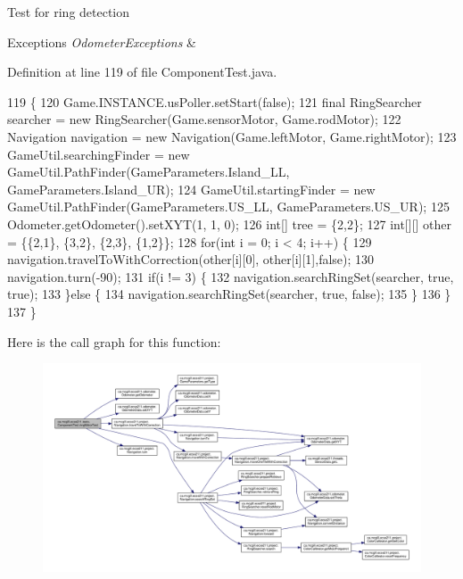 Test for ring detection


\begin{DoxyExceptions}{Exceptions}
{\em Odometer\+Exceptions} & \\
\hline
\end{DoxyExceptions}


Definition at line 119 of file Component\+Test.\+java.


\begin{DoxyCode}
119                                                                \{
120     Game.INSTANCE.usPoller.setStart(\textcolor{keyword}{false});
121     \textcolor{keyword}{final} RingSearcher searcher = \textcolor{keyword}{new} RingSearcher(Game.sensorMotor, Game.rodMotor);
122     Navigation navigation = \textcolor{keyword}{new} Navigation(Game.leftMotor, Game.rightMotor);
123     GameUtil.searchingFinder = \textcolor{keyword}{new} GameUtil.PathFinder(GameParameters.Island\_LL, GameParameters.Island\_UR);
124     GameUtil.startingFinder = \textcolor{keyword}{new} GameUtil.PathFinder(GameParameters.US\_LL, GameParameters.US\_UR);
125     Odometer.getOdometer().setXYT(1, 1, 0);
126     \textcolor{keywordtype}{int}[] tree = \{2,2\};
127     \textcolor{keywordtype}{int}[][] other = \{\{2,1\}, \{3,2\}, \{2,3\}, \{1,2\}\};
128     \textcolor{keywordflow}{for}(\textcolor{keywordtype}{int} i = 0; i < 4; i++) \{
129       navigation.travelToWithCorrection(other[i][0], other[i][1],\textcolor{keyword}{false});
130       navigation.turn(-90);
131       \textcolor{keywordflow}{if}(i != 3) \{
132         navigation.searchRingSet(searcher, \textcolor{keyword}{true}, \textcolor{keyword}{true});
133       \}\textcolor{keywordflow}{else} \{
134         navigation.searchRingSet(searcher, \textcolor{keyword}{true}, \textcolor{keyword}{false});
135       \}
136     \}
137   \}
\end{DoxyCode}
Here is the call graph for this function\+:
\nopagebreak
\begin{figure}[H]
\begin{center}
\leavevmode
\includegraphics[width=350pt]{enumca_1_1mcgill_1_1ecse211_1_1tests_1_1_component_test_a1ecca45b47067d825683cf46dcf22b62_cgraph}
\end{center}
\end{figure}

